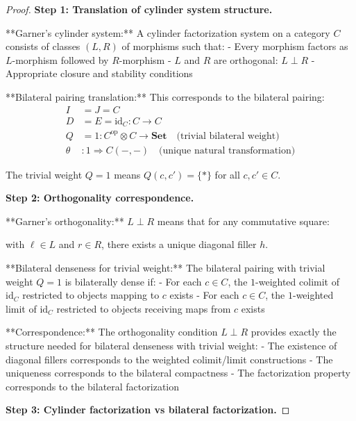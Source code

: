 \documentclass[11pt]{article}
\theoremstyle{plain}
\theoremstyle{definition}
\theoremstyle{remark}
\newcommand{\op}{\mathrm{op}}
\begin{document}
\begin{proof}
\textbf{Step 1: Translation of cylinder system structure.}

**Garner's cylinder system:** A cylinder factorization system on a category $C$ consists of classes $(L, R)$ of morphisms such that:
- Every morphism factors as $L$-morphism followed by $R$-morphism
- $L$ and $R$ are orthogonal: $L \perp R$
- Appropriate closure and stability conditions

**Bilateral pairing translation:** This corresponds to the bilateral pairing:
\begin{align}
I &= J = C \\
D &= E = \text{id}_C : C \to C \\
Q &= 1 : C^{\op} \otimes C \to \mathbf{Set} \quad \text{(trivial bilateral weight)} \\
\theta &: 1 \Rightarrow C(-, -) \quad \text{(unique natural transformation)}
\end{align}

The trivial weight $Q = 1$ means $Q(c, c') = \{*\}$ for all $c, c' \in C$.

\textbf{Step 2: Orthogonality correspondence.}

**Garner's orthogonality:** $L \perp R$ means that for any commutative square:
\begin{center}
\end{center}
with $\ell \in L$ and $r \in R$, there exists a unique diagonal filler $h$.

**Bilateral denseness for trivial weight:** The bilateral pairing with trivial weight $Q = 1$ is bilaterally dense if:
- For each $c \in C$, the $1$-weighted colimit of $\text{id}_C$ restricted to objects mapping to $c$ exists
- For each $c \in C$, the $1$-weighted limit of $\text{id}_C$ restricted to objects receiving maps from $c$ exists

**Correspondence:** The orthogonality condition $L \perp R$ provides exactly the structure needed for bilateral denseness with trivial weight:
- The existence of diagonal fillers corresponds to the weighted colimit/limit constructions
- The uniqueness corresponds to the bilateral compactness
- The factorization property corresponds to the bilateral factorization

\textbf{Step 3: Cylinder factorization vs bilateral factorization.}


\end{proof}
\end{document}
